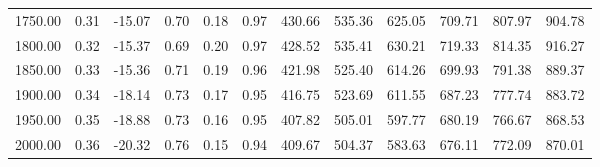 \begin{table}[ht]
\begin{tabular}{rrrrrrrrrrrr}
  1750.00 & 0.31 & -15.07 & 0.70 & 0.18 & 0.97 & 430.66 & 535.36 & 625.05 & 709.71 & 807.97 & 904.78 \\ 
  1800.00 & 0.32 & -15.37 & 0.69 & 0.20 & 0.97 & 428.52 & 535.41 & 630.21 & 719.33 & 814.35 & 916.27 \\ 
  1850.00 & 0.33 & -15.36 & 0.71 & 0.19 & 0.96 & 421.98 & 525.40 & 614.26 & 699.93 & 791.38 & 889.37 \\ 
  1900.00 & 0.34 & -18.14 & 0.73 & 0.17 & 0.95 & 416.75 & 523.69 & 611.55 & 687.23 & 777.74 & 883.72 \\ 
  1950.00 & 0.35 & -18.88 & 0.73 & 0.16 & 0.95 & 407.82 & 505.01 & 597.77 & 680.19 & 766.67 & 868.53 \\ 
  2000.00 & 0.36 & -20.32 & 0.76 & 0.15 & 0.94 & 409.67 & 504.37 & 583.63 & 676.11 & 772.09 & 870.01 \\ 
   \hline
\end{tabular}
\end{table}
